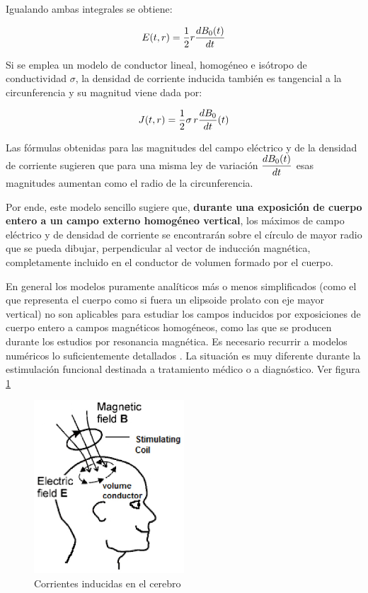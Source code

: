 Igualando ambas integrales se obtiene: 

\begin{equation}
	E(t, r)= \dfrac{1}{2}r\dfrac{dB_{0}(t)}{dt}
\end{equation}


Si se emplea un modelo de conductor lineal, homogéneo e isótropo de conductividad $\sigma$, la densidad de corriente inducida también es tangencial a la circunferencia y su magnitud viene dada por: 

\begin{equation}
	J(t, r)= \dfrac{1}{2}\sigma \,r \dfrac{dB_{0}}{dt}(t)
\end{equation}


Las fórmulas obtenidas para las magnitudes del campo eléctrico y de la densidad de corriente sugieren que para una misma ley de variación $\dfrac{dB_{0}(t)}{dt}$ esas magnitudes aumentan como el radio de la circunferencia.


Por ende, este modelo sencillo sugiere que, \textbf{durante una exposición de cuerpo entero a un campo externo homogéneo vertical}, los máximos de campo eléctrico y de densidad de corriente se encontrarán sobre el círculo de mayor radio que se pueda dibujar, perpendicular al vector de inducción magnética, completamente incluido en el conductor de volumen formado por el cuerpo.

En general los modelos puramente analíticos más o menos simplificados (como el que representa el cuerpo como si fuera un elipsoide prolato con eje mayor vertical) no son aplicables para estudiar los campos inducidos por exposiciones de cuerpo entero a campos magnéticos homogéneos, como las que se producen durante los estudios por resonancia magnética. Es necesario recurrir a modelos numéricos lo suficientemente detallados \citep{Lin_2012}.
La situación es muy diferente durante la estimulación funcional destinada a tratamiento médico o a diagnóstico. Ver figura \ref{fig:612}

\begin{figure}[H]
    \centering
    \includegraphics[width=0.5\textwidth]{./Figures/fig612}
	\caption{Corrientes inducidas en el cerebro}
	\label{fig:612}
\end{figure}

